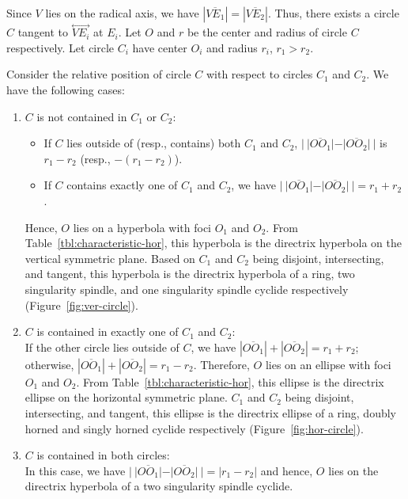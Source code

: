      Since $V$ lies on the radical axis, we have
$|\overline{VE_1}|=|\overline{VE_2}|$.  Thus, there exists a circle $C$
tangent to $\stackrel{\longleftrightarrow}{VE_i}$ at $E_i$.
Let $O$ and $r$ be the center and radius of circle $C$ respectively.
Let circle $C_i$ have center $O_i$ and radius $r_i$, $r_1>r_2$.  

     Consider the relative position of circle $C$ with respect to circles
$C_1$ and $C_2$.  We have the following cases:
\begin{enumerate}
     \item $C$ is not contained in $C_1$ or $C_2$:
     \begin{itemize}
          \item If $C$ lies outside of (resp., contains) both $C_1$ and $C_2$,
               $|\ |\overline{OO_1}|-|\overline{OO_2}|\ |$ is $r_1-r_2$
               (resp., $-(r_1-r_2)$).
          \item If $C$ contains exactly one of $C_1$ and $C_2$, we have
               $|\ |\overline{OO_1}|-|\overline{OO_2}|\ |=r_1+r_2$.
     \end{itemize}
          Hence, $O$ lies on a hyperbola with foci $O_1$ and $O_2$.  From
          Table~\ref{tbl:characteristic-hor}, this hyperbola is the
          directrix hyperbola on the vertical symmetric plane.  Based on
          $C_1$ and $C_2$ being disjoint, intersecting, and tangent, this
          hyperbola is the directrix hyperbola of a ring, two singularity
          spindle, and one singularity spindle cyclide respectively
          (Figure~\ref{fig:ver-circle}).
     \item $C$ is contained in exactly one of $C_1$ and $C_2$:\\
          If the other circle lies outside of $C$, we have
          $|\overline{OO_1}|+|\overline{OO_2}|=r_1+r_2$; otherwise,
          $|\overline{OO_1}|+|\overline{OO_2}|=r_1-r_2$.
          Therefore, $O$ lies on an ellipse with foci $O_1$ and $O_2$.
          From Table~\ref{tbl:characteristic-hor}, this ellipse is the
          directrix ellipse on the horizontal symmetric plane.
          $C_1$ and $C_2$ being disjoint, intersecting, and tangent, this
          ellipse is the directrix ellipse of a ring, doubly horned and
          singly horned cyclide respectively
          (Figure~\ref{fig:hor-circle}).
     \item $C$ is contained in both circles:\\
          In this case, we have 
          $|\ |\overline{OO_1}|-|\overline{OO_2}|\ | = |r_1-r_2|$ and hence,
          $O$ lies on the directrix hyperbola of a two singularity spindle
          cyclide.
\end{enumerate}
